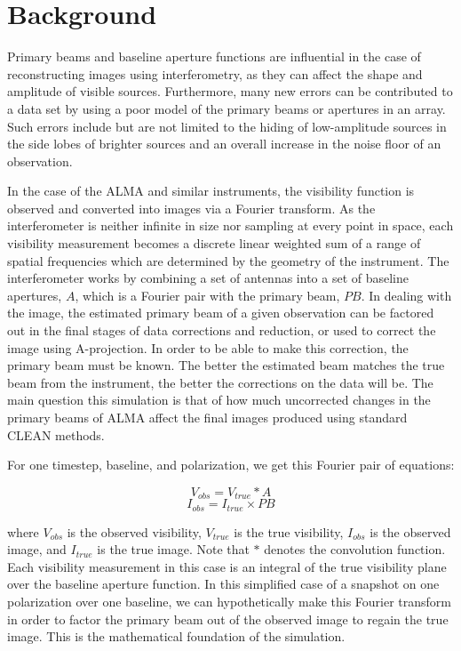 \documentclass[11pt]{article}
\begin{document}
\section{Background}

Primary beams and baseline aperture functions are influential in the case of
reconstructing images using interferometry, as they can affect the shape and
amplitude of visible sources. Furthermore, many new errors can be
contributed to a data set by using a poor model of the primary beams or
apertures in an array. Such errors include but are not limited to the hiding of 
low-amplitude
sources in the side lobes of brighter sources and an overall increase in the
noise floor of an observation.

In the case of the ALMA and similar instruments, the visibility function is 
observed and converted into images
via a Fourier transform. As the interferometer is neither infinite in size nor 
sampling at every point in space, each visibility measurement becomes a 
discrete linear weighted sum of a range of spatial frequencies which are 
determined by the geometry of the instrument. The interferometer works by 
combining a set of
antennas into a set of baseline apertures, $A$, which is a Fourier pair with
the primary beam, $PB$. In dealing with the image, the estimated
primary beam of a given observation can be factored out in the final stages of
data corrections and reduction, or used to correct the image using 
A-projection.  In order to be able to make this correction, the primary beam 
must be known.
The better the estimated beam matches the true beam from the instrument,
the better the corrections on the data will be. The main question this 
simulation is that of how much uncorrected changes in the primary beams of ALMA 
affect the final images produced using standard CLEAN methods.

For one timestep, baseline, and polarization, we get this Fourier pair of 
equations:

\begin{equation}
    \label{eq:vis}
    V_{obs} = V_{true} * A
\end{equation}
\begin{equation}
    \label{eq:im}
    I_{obs} = I_{true} \times PB
\end{equation}

where $V_{obs}$ is the observed visibility, $V_{true}$ is the true visibility, 
$I_{obs}$ is the observed image, and $I_{true}$ is the true image. Note that 
$*$ denotes the convolution function. Each visibility measurement in this case 
is an integral of the true visibility plane over the baseline aperture 
function. In this simplified case of a snapshot on one polarization over one 
baseline, we can hypothetically make this Fourier transform in order to factor 
the primary beam out of the observed image to regain the true image. This is 
the mathematical foundation of the simulation.
\end{document}
